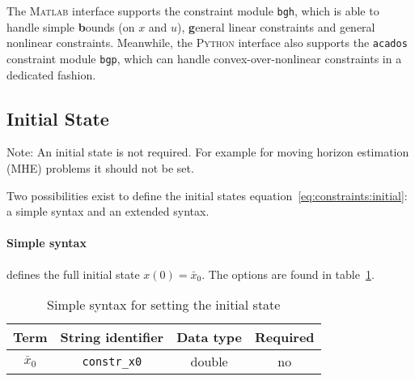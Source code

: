 \documentclass[english]{article}
\newcommand{\code}[1]{\texttt{#1}}
\newcommand{\str}[1]{\texttt{'#1'}}
\newcommand{\acados}{\texttt{acados}}
\newcommand{\matlab}{\textsc{Matlab}}
\newcommand{\python}{\textsc{Python}}
\newcommand{\optional}{no}
\begin{document}
The \matlab{} interface supports the constraint module \code{bgh}, which is able to handle simple \textbf{b}ounds (on $ x $ and $ u $), \textbf{g}eneral linear constraints and general nonlinear constraints.
Meanwhile, the \python{} interface also supports the \acados{} constraint module \code{bgp}, which can handle convex-over-nonlinear constraints in a dedicated fashion.
%
\subsection{Initial State}\label{sec:constraints:initial}
%
Note: An initial state is not required.
For example for moving horizon estimation (MHE) problems it should not be set.

Two possibilities exist to define the initial states equation~\eqref{eq:constraints:initial}: a simple syntax and an extended syntax.

\paragraph{Simple syntax}
defines the full initial state $x(0)=\bar{x}_0$. The options are found in table~\ref{tab:constraints:simplesyntax}.
\begin{table}[ht!]
    \centering
    \caption{Simple syntax for setting the initial state} \label{tab:constraints:simplesyntax}
    \begin{tabular}{cccc}
        \toprule
        Term & String identifier & Data type & Required \\ \midrule
        $ \bar{x}_0 $ & \code{constr\_x0} & double & \optional \\
        \bottomrule
    \end{tabular}
\end{table}
%
\end{document}
